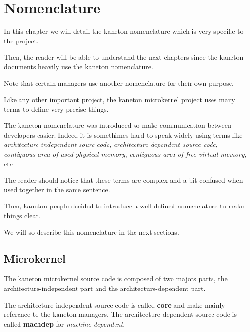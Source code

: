 
%
%

\chapter{Nomenclature}

In this chapter we will detail the kaneton nomenclature which is very
specific to the project.

Then, the reader will be able to understand the next chapters since the
kaneton documents heavily use the kaneton nomenclature.

Note that certain managers use another nomenclature for their own
purpose.

\newpage

%
%

Like any other important project, the kaneton microkernel project
uses many terms to define very precise things.

The kaneton nomenclature was introduced to make communication between
developers easier. Indeed it is somethimes hard to speak widely using
terms like \textit{architecture-independent soure code},
\textit{architecture-dependent source code},
\textit{contiguous area of used physical memory},
\textit{contiguous area of free virtual memory}, etc..

The reader should notice that these terms are complex and a bit confused
when used together in the same sentence.

Then, kaneton people decided to introduce a well defined nomenclature
to make things clear.

We will so describe this nomenclature in the next sections.

%
%

\section{Microkernel}

The kaneton microkernel source code is composed of two majors parts, the
architecture-independent part and the architecture-dependent part.

The architecture-independent source code is called \textbf{core} and
make mainly reference to the kaneton managers. The architecture-dependent
source code is called \textbf{machdep} for \textit{machine-dependent}.

